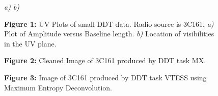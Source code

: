 \clearpage
\begin{figure}[t]

{\it \hskip 1in a) \hfill b) \hskip 1in}

{\bf Figure 1:}
UV Plots of small DDT data. Radio source is 3C161.
{\it a)} Plot of Amplitude versus Baseline
length. {\it b)} Location of visibilities in the UV plane.
\end{figure}

\begin{figure}
\vskip 2.5in

{\bf Figure 2:}
Cleaned Image of 3C161 produced by DDT task MX.
\end{figure}

\begin{figure}
\vskip 2.5in

{\bf Figure 3:}
Image of 3C161 produced by DDT task VTESS using Maximum Entropy
Deconvolution.
\end{figure}

\clearpage
